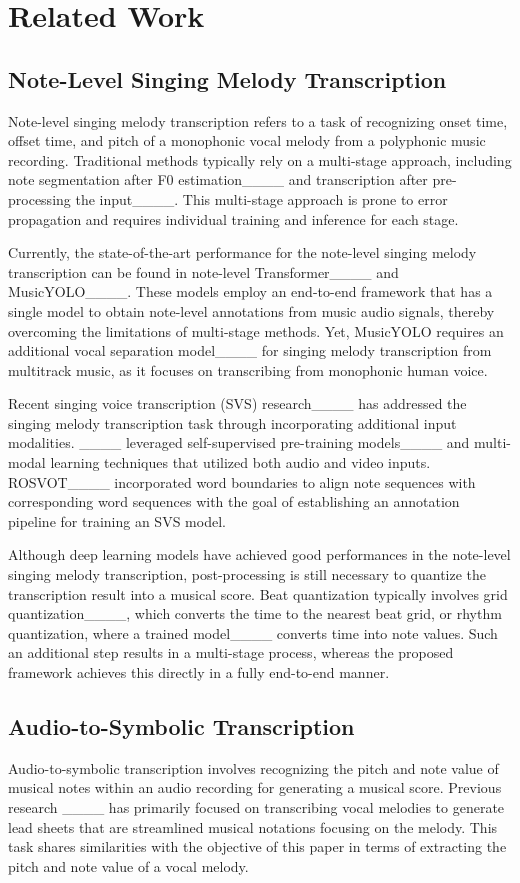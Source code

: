 \section{Related Work}
\subsection{Note-Level Singing Melody Transcription}
Note-level singing melody transcription refers to a task of recognizing onset time, offset time, and pitch of a monophonic vocal melody from a polyphonic music recording. Traditional methods typically rely on a multi-stage approach, including note segmentation after F0 estimation____ and transcription after pre-processing the input____. This multi-stage approach is prone to error propagation and requires individual training and inference for each stage.

Currently, the state-of-the-art performance for the note-level singing melody transcription can be found in note-level Transformer____ and MusicYOLO____. 
These models employ an end-to-end framework that has a single model to obtain note-level annotations from music audio signals, thereby overcoming the limitations of multi-stage methods. Yet, MusicYOLO requires an additional vocal separation model____ for singing melody transcription from multitrack music, as it focuses on transcribing from monophonic human voice.

Recent singing voice transcription (SVS) research____ has addressed the singing melody transcription task through incorporating additional input modalities. ____ leveraged self-supervised pre-training models____ and multi-modal learning techniques that utilized both audio and video inputs. ROSVOT____ incorporated word boundaries to align note sequences with corresponding word sequences with the goal of establishing an annotation pipeline for training an SVS model.

Although deep learning models have achieved good performances in the note-level singing melody transcription, post-processing is still necessary to quantize the transcription result into a musical score. Beat quantization typically involves grid quantization____, which converts the time to the nearest beat grid, or rhythm quantization, where a trained model____ converts time into note values. Such an additional step results in a multi-stage process, whereas the proposed framework achieves this directly in a fully end-to-end manner.

\subsection{Audio-to-Symbolic Transcription}
Audio-to-symbolic transcription involves recognizing the pitch and note value of musical notes within an audio recording for generating a musical score.
Previous research ____ has primarily focused on transcribing vocal melodies to generate lead sheets that are streamlined musical notations focusing on the melody. This task shares similarities with the objective of this paper in terms of extracting the pitch and note value of a vocal melody.

